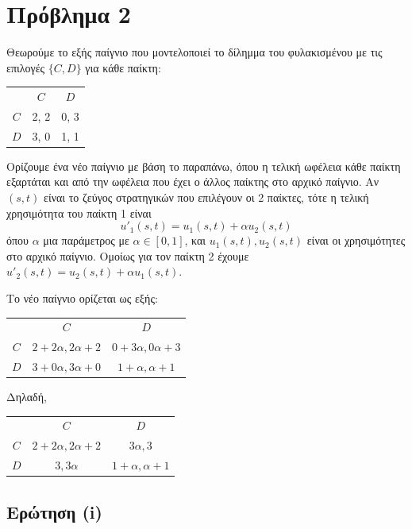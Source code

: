 \section{Πρόβλημα 2}

Θεωρούμε το εξής παίγνιο που μοντελοποιεί το δίλημμα του φυλακισμένου με τις
επιλογές $\{C, D\}$ για κάθε παίκτη:

\begin{center}
\begin{tabular}{ccc}
        & $C$  & $D$  \\
    $C$ & 2, 2 & 0, 3 \\
    $D$ & 3, 0 & 1, 1 \\
\end{tabular}
\end{center}

Ορίζουμε ένα νέο παίγνιο με βάση το παραπάνω, όπου η τελική ωφέλεια κάθε παίκτη
εξαρτάται και από την ωφέλεια που έχει ο άλλος παίκτης στο αρχικό παίγνιο.
Αν $(s, t)$ είναι το ζεύγος στρατηγικών που επιλέγουν οι 2 παίκτες, τότε η
τελική χρησιμότητα του παίκτη 1 είναι
$$
u'_1(s, t) = u_1(s, t) + \alpha u_2(s, t)
$$
όπου $\alpha$ μια παράμετρος με $\alpha \in [0, 1]$, και $u_1(s,t), u_2(s,t)$
είναι οι χρησιμότητες στο αρχικό παίγνιο. Ομοίως για τον παίκτη 2 έχουμε
$u'_2(s, t) = u_2(s, t) + \alpha u_1(s, t)$.

Το νέο παίγνιο ορίζεται ως εξής:
\begin{center}
\begin{tabular}{ccc}
        & $C$  & $D$  \\
    $C$ & $2 + 2 \alpha, 2\alpha + 2$ & $0 + 3\alpha, 0\alpha + 3$ \\
    $D$ & $3 + 0 \alpha, 3\alpha + 0$ & $1 + \alpha, \alpha + 1$ \\
\end{tabular}
\end{center}
Δηλαδή,
\begin{center}
\begin{tabular}{ccc}
        & $C$  & $D$  \\
    $C$ & $2 + 2 \alpha, 2\alpha + 2$ & $3\alpha, 3$ \\
    $D$ & $3, 3\alpha$ & $1 + \alpha, \alpha + 1$ \\
\end{tabular}
\end{center}


\subsection{Ερώτηση (i)}

